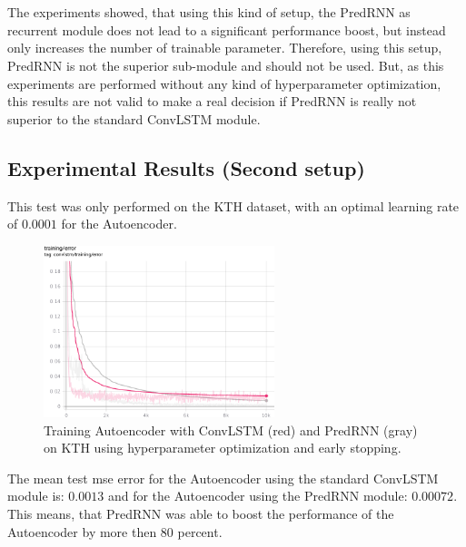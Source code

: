  \\\\
 The experiments showed, that using this kind of setup, the PredRNN as recurrent module does not lead to a significant performance boost, but instead only
 increases the number of trainable parameter. Therefore, using this setup, PredRNN is not the superior sub-module and should not be used. But, as this experiments
 are performed without any kind of hyperparameter optimization, this results are not valid to make a real decision if PredRNN is really not superior to the 
 standard ConvLSTM module.

 \subsection{Experimental Results (Second setup)} \label{subsection::second_exp}
  This test was only performed on the KTH dataset, with an optimal learning rate of $0.0001$ for the Autoencoder.
  \begin{figure}[H]
   \includegraphics[width=0.6\textwidth]{../Images/exp2_training_error.png}
   \centering
   \caption{Training Autoencoder with ConvLSTM (red) and PredRNN (gray) on KTH using hyperparameter optimization and early stopping.}
   \label{fig:autoenc_exp2_training}
  \end{figure}\noindent
  The mean test mse error for the Autoencoder using the standard ConvLSTM module is: $0.0013$ and for the Autoencoder using the PredRNN module: $0.00072$.
  This means, that PredRNN was able to boost the performance of the Autoencoder by more then $80$ percent.
